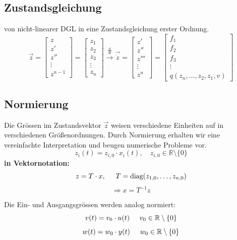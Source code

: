     \subsection{Zustandsgleichung}
	    von nicht-linearer DGL in eine Zustandsgleichung erster Ordnung. 
 	    \[\vec{z} = \begin{bmatrix} z \\ z' \\ z'' \\ \vdots \\z^{n-1} \end{bmatrix}  = \begin{bmatrix} z_1 \\ z_2 \\ z_3 \\ \vdots \\z_n \end{bmatrix}
         \xrightarrow{\frac{d}{dt}} \vec{\dot{z}} = \begin{bmatrix} z' \\ z'' \\ z''' \\ \vdots \\z^{n} \end{bmatrix} = \begin{bmatrix} f_1 \\ f_2 \\ f_3 \\ \vdots \\q(z_n,\hdots,z_2,z_1,v) \end{bmatrix}\]
         
    \subsection{Normierung}
        Die Grössen im Zustandsvektor $\vec{z}$ weisen verschiedene Einheiten auf in verschiedenen Größenordnungen. Durch Normierung erhalten wir eine vereinfachte Interpretation und beugen numerische Probleme vor. 
        \[z_i(t) = z_{i,0}\cdot x_i(t), \quad z_{i,0} \in\mathbb{R}\setminus\{0\} \] 
        \textbf{in Vektornotation:}
        \[ z = T \cdot x, \hspace{5mm}  T = \textrm{diag}(z_{1,0},\hdots,z_{n,0})\] 
        \[\Rightarrow x=T^{-1}z\]
    
        Die Ein- und Ausgangsgrössen werden analog normiert:
        \[v(t) = v_0 \cdot u(t) \hspace{5mm} v_0 \in\mathbb{R}\setminus\{0\}\]
        \[w(t) = w_0 \cdot y(t) \hspace{5mm} w_0 \in\mathbb{R}\setminus\{0\}\]
    
